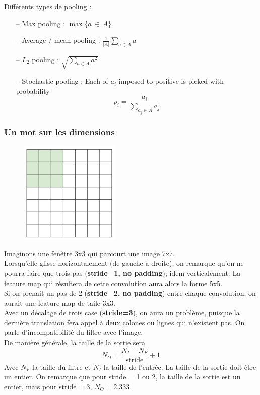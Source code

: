 \documentclass[a4paper,12pt]{report}
\newcommand\bk{\color{black}}
\newcommand\navy{\color{navy}}
\numberwithin{equation}{section} %
\begin{document}
Différents types de pooling : 
\begin{itemize}[leftmargin=2cm]
	\item[--] Max pooling : $\max \{ a \, \in \, A\}$
	\item[--] Average / mean pooling : $\frac{1}{\vert A \vert}\sum_{a\in A} a$
	\item[--] $L_2$ pooling : $\sqrt{\sum^{ ^{ }}_{a\in A} a^2}$
	\item[--] Stochastic pooling : Each of $a_i$ imposed to positive is picked with probability $$p_i = \frac{a_i}{\sum_{a_j \in A} a_j}$$
\end{itemize}

\navy \subsubsection{Un mot sur les dimensions} \bk
\begin{figure}
\centering
\includegraphics[scale=0.4]{7x3.png}
\end{figure}

Imaginons une fenêtre 3x3 qui parcourt une image 7x7.\\
Lorsqu'elle glisse horizontalement (de gauche à droite), on remarque qu'on ne pourra faire que trois pas (\textbf{stride=1, no padding}); idem verticalement. La feature map qui résultera de cette convolution aura alors la forme 5x5. \\
Si on prenait un pas de 2 (\textbf{stride=2, no padding}) entre chaque convolution, on aurait une feature map de taile 3x3.\\
Avec un décalage de trois case (\textbf{stride=3}), on aura un problème, puisque la dernière translation fera appel à deux colones ou lignes qui n'existent pas. On parle d'incompatibilité du filtre avec l'image.\\

De manière générale, la taille de la sortie sera $$ N_O = \frac{N_I - N_F}{\text{stride}} + 1$$ Avec $N_F$ la taille du filtre et $N_I$ la taille de l'entrée. La taille de la sortie doit être un entier. On remarque que pour stride = 1 ou 2, la taille de la sortie est un entier, mais pour stride = 3, $N_O=2.333$.\\
\end{document}

